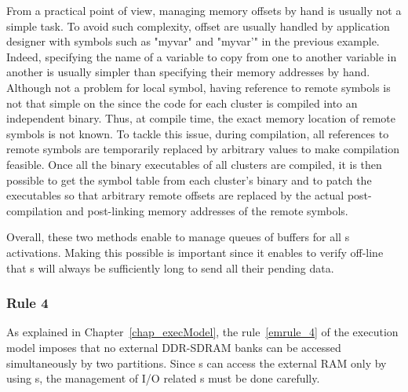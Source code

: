 \documentclass[main.tex]{subfiles}
\begin{document}
\begin{description}
        From a practical point of view, managing memory offsets by hand is usually not a simple task. To avoid such complexity, offset are usually handled by application designer with symbols such as "myvar" and "myvar'" in the previous example. Indeed, specifying the name of a variable to copy from one \PN{} to another variable in another \PN{} is usually simpler than specifying their memory addresses by hand. Although not a problem for local symbol, having reference to remote symbols is not that simple on the \mppalong since the code for each cluster is compiled into an independent binary. Thus, at compile time, the exact memory location of remote symbols is not known. To tackle this issue, during compilation, all references to remote symbols are temporarily replaced by arbitrary values to make compilation feasible. Once all the binary executables of all clusters are compiled, it is then possible to get the symbol table from each cluster's binary and to patch the executables so that arbitrary remote offsets are replaced by the actual post-compilation and post-linking memory addresses of the remote symbols. 
\end{description}

Overall, these two methods enable to manage queues of buffers for all \PC{}s activations. Making this possible is important since it enables to verify off-line that \PC{}s will always be sufficiently long to send all their pending data.

\subsubsection{Rule 4}
As explained in Chapter~\ref{chap_execModel}, the rule~\ref{emrule_4} of the execution model imposes that no external DDR-SDRAM banks can be accessed simultaneously by two partitions. Since \PN{}s can access the external RAM only by using \PC{}s, the management of I/O related \PC{}s must be done carefully.
\end{document}
